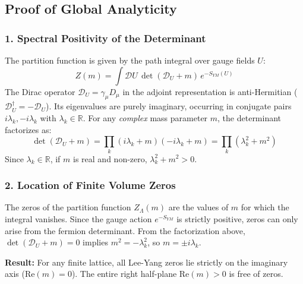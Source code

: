 \subsection{Proof of Global Analyticity}

\subsubsection{1. Spectral Positivity of the Determinant}
The partition function is given by the path integral over gauge fields $U$:
\begin{equation}
    Z(m) = \int \mathcal{D}U \, \det(\mathcal{D}_U + m) \, e^{-S_{YM}(U)}
\end{equation}
The Dirac operator $\mathcal{D}_U = \gamma_\mu D_\mu$ in the adjoint representation is anti-Hermitian ($\mathcal{D}_U^\dagger = -\mathcal{D}_U$). Its eigenvalues are purely imaginary, occurring in conjugate pairs $i\lambda_k, -i\lambda_k$ with $\lambda_k \in \mathbb{R}$.
For any \textit{complex} mass parameter $m$, the determinant factorizes as:
\begin{equation}
    \det(\mathcal{D}_U + m) = \prod_k (i\lambda_k + m)(-i\lambda_k + m) = \prod_k (\lambda_k^2 + m^2)
\end{equation}
Since $\lambda_k \in \mathbb{R}$, if $m$ is real and non-zero, $\lambda_k^2 + m^2 > 0$.

\subsubsection{2. Location of Finite Volume Zeros}
The zeros of the partition function $Z_\Lambda(m)$ are the values of $m$ for which the integral vanishes. Since the gauge action $e^{-S_{YM}}$ is strictly positive, zeros can only arise from the fermion determinant.
From the factorization above, $\det(\mathcal{D}_U + m) = 0$ implies $m^2 = -\lambda_k^2$, so $m = \pm i \lambda_k$.

\textbf{Result:} For any finite lattice, all Lee-Yang zeros lie strictly on the imaginary axis ($\text{Re}(m) = 0$). The entire right half-plane $\text{Re}(m) > 0$ is free of zeros.

